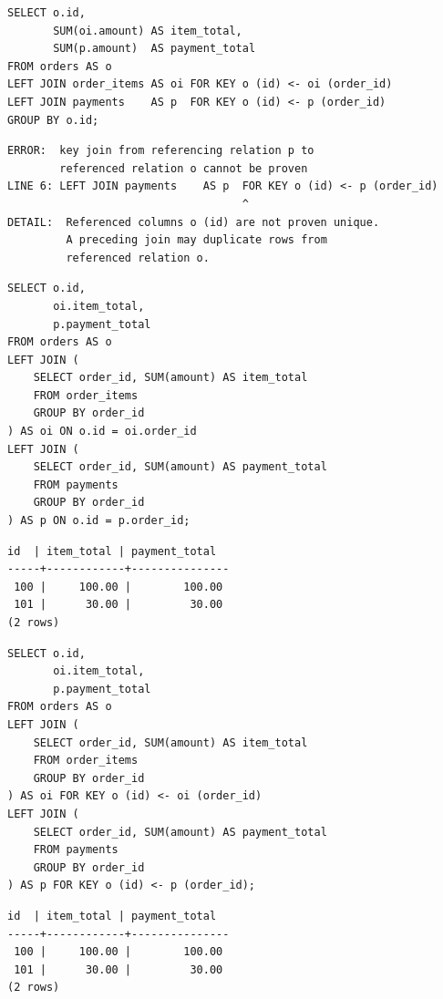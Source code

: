 \documentclass[12pt]{article}
\begin{document}
\begin{lrbox}{\rawkey}\begin{minipage}{13.8cm}
\begin{lstlisting}[style=sql]
SELECT o.id,
       SUM(oi.amount) AS item_total,
       SUM(p.amount)  AS payment_total
FROM orders AS o
LEFT JOIN order_items AS oi FOR KEY o (id) <- oi (order_id)
LEFT JOIN payments    AS p  FOR KEY o (id) <- p (order_id)
GROUP BY o.id;
\end{lstlisting}
\vspace{.25cm}
\begin{lstlisting}[style=diagnostic]
ERROR:  key join from referencing relation p to
        referenced relation o cannot be proven
LINE 6: LEFT JOIN payments    AS p  FOR KEY o (id) <- p (order_id)
                                    ^
DETAIL:  Referenced columns o (id) are not proven unique.
         A preceding join may duplicate rows from
         referenced relation o.
\end{lstlisting}
\end{minipage}\end{lrbox}

\begin{lrbox}{\groupedon}\begin{minipage}{11.9cm}
\begin{lstlisting}[style=sql]
SELECT o.id,
       oi.item_total,
       p.payment_total
FROM orders AS o
LEFT JOIN (
    SELECT order_id, SUM(amount) AS item_total
    FROM order_items
    GROUP BY order_id
) AS oi ON o.id = oi.order_id
LEFT JOIN (
    SELECT order_id, SUM(amount) AS payment_total
    FROM payments
    GROUP BY order_id
) AS p ON o.id = p.order_id;
\end{lstlisting}
\vspace{.25cm}
\begin{lstlisting}[style=mono]
 id  | item_total | payment_total
-----+------------+---------------
 100 |     100.00 |        100.00
 101 |      30.00 |         30.00
(2 rows)
\end{lstlisting}
\end{minipage}\end{lrbox}

\begin{lrbox}{\groupedkey}\begin{minipage}{13.8cm}
\begin{lstlisting}[style=sql]
SELECT o.id,
       oi.item_total,
       p.payment_total
FROM orders AS o
LEFT JOIN (
    SELECT order_id, SUM(amount) AS item_total
    FROM order_items
    GROUP BY order_id
) AS oi FOR KEY o (id) <- oi (order_id)
LEFT JOIN (
    SELECT order_id, SUM(amount) AS payment_total
    FROM payments
    GROUP BY order_id
) AS p FOR KEY o (id) <- p (order_id);
\end{lstlisting}
\vspace{.25cm}
\begin{lstlisting}[style=mono]
 id  | item_total | payment_total
-----+------------+---------------
 100 |     100.00 |        100.00
 101 |      30.00 |         30.00
(2 rows)
\end{lstlisting}
\end{minipage}\end{lrbox}
\end{document}
